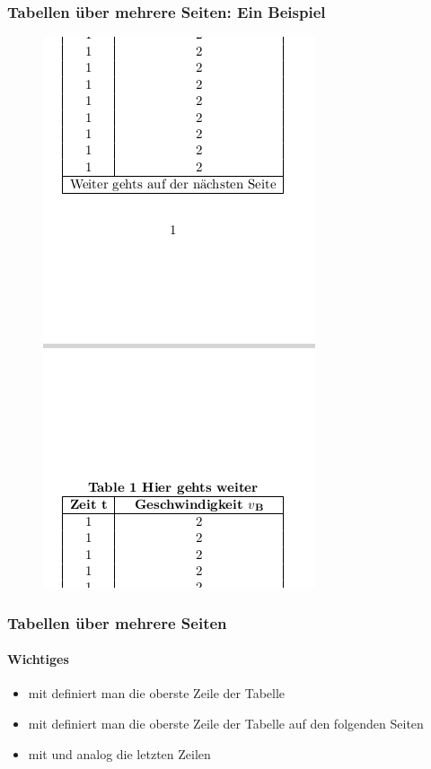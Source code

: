\begin{frame}[fragile]
\frametitle{Tabellen über mehrere Seiten: Ein Beispiel}
\begin{figure}
 \includegraphics[height=0.8\textheight]{images/longtable_v2.png}
\end{figure}

\end{frame}

\begin{frame}[fragile]
\frametitle{Tabellen über mehrere Seiten}
\framesubtitle{Wichtiges}
\begin{itemize}
\item mit  definiert man die oberste Zeile der Tabelle 
\item mit  definiert man die oberste Zeile der Tabelle auf den folgenden Seiten
\item mit  und  analog die letzten Zeilen
\end{itemize}
\end{frame}

